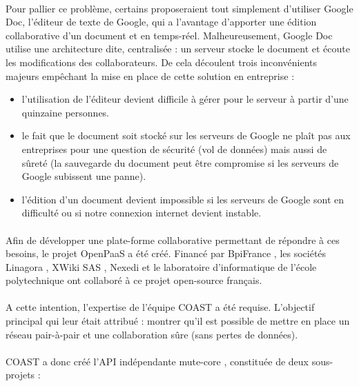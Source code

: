 \documentclass[12pt]{article}
\begin{document}
\paragraph{}
Pour pallier ce problème, certains proposeraient tout simplement d'utiliser Google Doc, l'éditeur de texte de Google, qui a l'avantage d'apporter une édition collaborative d'un document et en temps-réel. Malheureusement, Google Doc utilise une architecture dite, centralisée : un serveur stocke le document et écoute les modifications des collaborateurs. De cela découlent trois inconvénients majeurs empêchant la mise en place de cette solution en entreprise :\\
\begin{itemize}
    \item l'utilisation de l'éditeur devient difficile à gérer pour le serveur à partir d'une quinzaine personnes.
    \item le fait que le document soit stocké sur les serveurs de Google ne plaît pas aux entreprises pour une question de sécurité (vol de données) mais aussi de sûreté (la sauvegarde du document peut être compromise si les serveurs de Google subissent une panne).
    \item l'édition d'un document devient impossible si les serveurs de Google sont en difficulté ou si notre connexion internet devient instable.
\end{itemize}
\paragraph{}
Afin de développer une plate-forme collaborative permettant de répondre à ces besoins, le projet OpenPaaS \cite{openpaas} a été créé. Financé par BpiFrance \cite{bpi}, les sociétés Linagora \cite{linagora}, XWiki SAS \cite{xwiki}, Nexedi \cite{nexedi} et le laboratoire d'informatique de l'école polytechnique ont collaboré à ce projet open-source français.
\paragraph{}
A cette intention, l'expertise de l'équipe COAST a été requise. L'objectif principal qui leur était attribué : montrer qu'il est possible de mettre en place un réseau pair-à-pair et une collaboration sûre (sans pertes de données).
\paragraph{}
COAST a donc créé l'API indépendante mute-core \cite{mute-core}, constituée de deux sous-projets :
\end{document}
